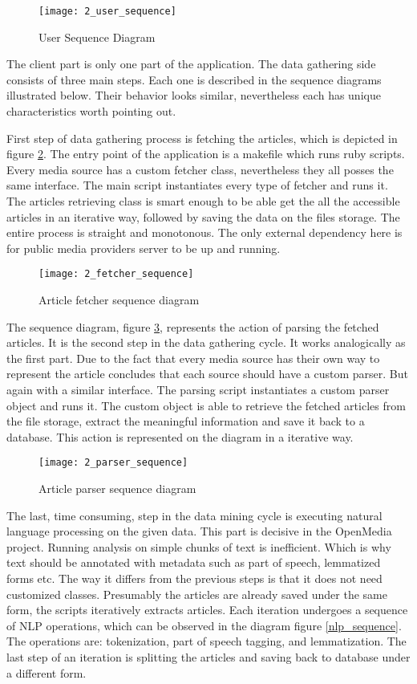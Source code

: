 \begin{figure}[!ht]
\centering
\texttt{[image: 2\_user\_sequence]}
\caption{User Sequence Diagram}\label{user_sequence}
\end{figure}

The client part is only one part of the application. The data gathering side consists of three main steps. Each one is described in the sequence diagrams illustrated below. Their behavior looks similar, nevertheless each has unique characteristics worth pointing out.

First step of data gathering process is fetching the articles, which is depicted in figure \ref{fetcher_sequence}. The entry point of the application is a makefile which runs ruby scripts. Every media source has a custom fetcher class, nevertheless they all posses the same interface. The main script instantiates every type of fetcher and runs it. The articles retrieving class is smart enough to be able get the all the accessible articles in an iterative way, followed by saving the data on the files storage. The entire process is straight and monotonous. The only external dependency here is for public media providers server to be up and running.

\begin{figure}[!ht]
\centering
\texttt{[image: 2\_fetcher\_sequence]}
\caption{Article fetcher sequence diagram}\label{fetcher_sequence}
\end{figure}

The sequence diagram, figure \ref{parser_sequence}, represents the action of parsing the fetched articles. It is the second step in the data gathering cycle. It works analogically as the first part. Due to the fact that every media source has their own way to represent the article concludes that each source should have a custom parser. But again with a similar interface. The parsing script instantiates a custom parser object and runs it. The custom object is able to retrieve the fetched articles from the file storage, extract the meaningful information and save it back to a database. This action is represented on the diagram in a iterative way.

\begin{figure}[!ht]
\centering
\texttt{[image: 2\_parser\_sequence]}
\caption{Article parser sequence diagram}\label{parser_sequence}
\end{figure}

The last, time consuming, step in the data mining cycle is executing natural language processing on the given data. This part is decisive in the OpenMedia project. Running analysis on simple chunks of text is inefficient. Which is why text should be annotated with metadata such as part of speech, lemmatized forms etc. The way it differs from the previous steps is that it does not need customized classes. Presumably the articles are already saved under the same form, the scripts iteratively extracts articles. Each iteration undergoes a sequence of NLP operations, which can be observed in the diagram figure \ref{nlp_sequence}. The operations are: tokenization, part of speech tagging, and lemmatization. The last step of an iteration is splitting the articles and saving back to database under a different form.

